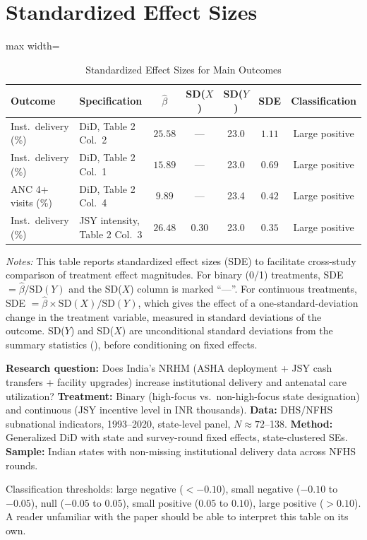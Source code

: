 \documentclass[12pt]{article}
\begin{document}
\section{Standardized Effect Sizes}
\label{sec:sde}

\begin{table}[H]
\centering
\caption{Standardized Effect Sizes for Main Outcomes}
\label{tab:sde}
\begin{adjustbox}{max width=\textwidth}
\begin{tabular}{llccccc}
\toprule
Outcome & Specification & $\hat{\beta}$ & SD($X$) & SD($Y$) & SDE & Classification \\
\midrule
Inst.\ delivery (\%) & DiD, Table 2 Col.\ 2 & $25.58$ & --- & 23.0 & $1.11$ & Large positive \\
Inst.\ delivery (\%) & DiD, Table 2 Col.\ 1 & $15.89$ & --- & 23.0 & $0.69$ & Large positive \\
ANC 4+ visits (\%) & DiD, Table 2 Col.\ 4 & $9.89$ & --- & 23.4 & $0.42$ & Large positive \\
Inst.\ delivery (\%) & JSY intensity, Table 2 Col.\ 3 & $26.48$ & 0.30 & 23.0 & $0.35$ & Large positive \\
\bottomrule
\end{tabular}
\end{adjustbox}
\par\vspace{0.3em}
{\footnotesize \emph{Notes:} This table reports standardized effect sizes (SDE)
to facilitate cross-study comparison of treatment effect magnitudes.
For binary (0/1) treatments, SDE $= \hat{\beta} / \text{SD}(Y)$ and the SD($X$)
column is marked ``---''.
For continuous treatments, SDE $= \hat{\beta} \times \text{SD}(X) / \text{SD}(Y)$,
which gives the effect of a one-standard-deviation change in the treatment variable,
measured in standard deviations of the outcome.
SD($Y$) and SD($X$) are unconditional standard deviations from the summary
statistics (), before conditioning on fixed effects.

\textbf{Research question:} Does India's NRHM (ASHA deployment + JSY cash transfers + facility upgrades) increase institutional delivery and antenatal care utilization?
\textbf{Treatment:} Binary (high-focus vs.\ non-high-focus state designation) and continuous (JSY incentive level in INR thousands).
\textbf{Data:} DHS/NFHS subnational indicators, 1993--2020, state-level panel, $N \approx 72$--138.
\textbf{Method:} Generalized DiD with state and survey-round fixed effects, state-clustered SEs.
\textbf{Sample:} Indian states with non-missing institutional delivery data across NFHS rounds.

Classification thresholds:
large negative ($< -0.10$), small negative ($-0.10$ to $-0.05$),
null ($-0.05$ to $0.05$), small positive ($0.05$ to $0.10$),
large positive ($> 0.10$).
A reader unfamiliar with the paper should be able to interpret this table
on its own.}
\end{table}
\end{document}
